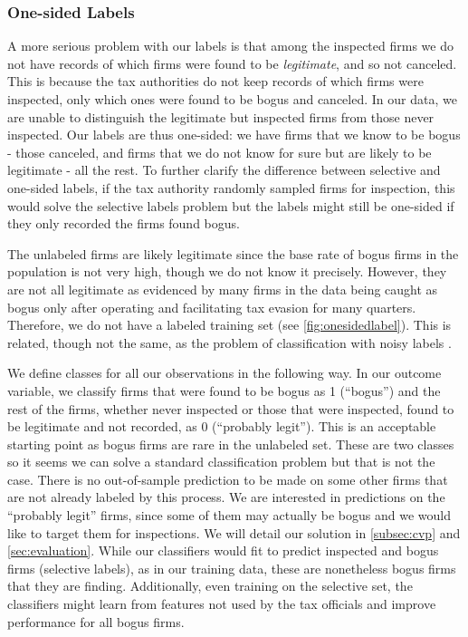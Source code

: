 \subsubsection{One-sided Labels}
\label{subsubsec:one-sided-labels} 
A more serious problem with our labels is that among the inspected firms we do not have records of which firms were found to be \textit{legitimate}, and so not canceled. This is because the tax authorities do not keep records of which firms were inspected, only which ones were found to be bogus and canceled. In our data, we are unable to distinguish the legitimate but inspected firms from those never inspected. Our labels are thus one-sided: we have firms that we know to be bogus - those canceled, and firms that we do not know for sure but are likely to be legitimate - all the rest. To further clarify the difference between selective and one-sided labels, if the tax authority randomly sampled firms for inspection, this would solve the selective labels problem but the labels might still be one-sided if they only recorded the firms found bogus.

The unlabeled firms are likely legitimate since the base rate of bogus firms in the population is not very high, though we do not know it precisely. However, they are not all legitimate as evidenced by many firms in the data being caught as bogus only after operating and facilitating tax evasion for many quarters. Therefore, we do not have a labeled training set (see \cref{fig:onesidedlabel}). This is related, though not the same, as the problem of classification with noisy labels \citep{liu2016classification, natarajan2013learning}.

We define classes for all our observations in the following way. In our outcome variable, we classify firms that were found to be bogus as 1 (``bogus'') and the rest of the firms, whether never inspected or those that were inspected, found to be legitimate and not recorded, as 0 (``probably legit''). This is an acceptable starting point as bogus firms are rare in the unlabeled set. These are two classes so it seems we can solve a standard classification problem but that is not the case. There is no out-of-sample prediction to be made on some other firms that are not already labeled by this process. We are interested in predictions on the ``probably legit'' firms, since some of them may actually be bogus and we would like to target them for inspections. We will detail our solution in \cref{subsec:cvp} and \cref{sec:evaluation}. While our classifiers would fit to predict inspected and bogus firms (selective labels), as in our training data, these are nonetheless bogus firms that they are finding. Additionally, even training on the selective set, the classifiers might learn from features not used by the tax officials and improve performance for all bogus firms.

